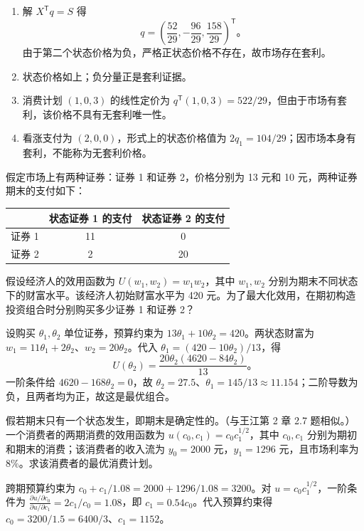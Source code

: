 \begin{solution}
\begin{enumerate}[label=(\alph*)]
\item 解 $X^{\mathsf T}q=S$ 得
\[
q=\left(\frac{52}{29},-\frac{96}{29},\frac{158}{29}\right)^{\mathsf T}。
\]
由于第二个状态价格为负，严格正状态价格不存在，故市场存在套利。
\item 状态价格如上；负分量正是套利证据。
\item 消费计划 $(1,0,3)$ 的线性定价为 $q^{\mathsf T}(1,0,3)=522/29$，但由于市场有套利，该价格不具有无套利唯一性。
\item 看涨支付为 $(2,0,0)$，形式上的状态价格值为 $2q_1=104/29$；因市场本身有套利，不能称为无套利价格。
\end{enumerate}
\end{solution}
\begin{problem}
 假定市场上有两种证券：证券 1 和证券 2，价格分别为 \num{13} 元和 \num{10} 元，两种证券期末的支付如下：
\begin{center}
\begin{tabular}{ccc}
    & 状态证券 1 的支付 & 状态证券 2 的支付\\
    \hline
    证券 1 & 11 & 0\\
    证券 2 & 2 & 20
\end{tabular}
\end{center}
假设经济人的效用函数为 $U(w_1,w_2)=w_1 w_2$，其中 $w_1,w_2$ 分别为期末不同状态下的财富水平。该经济人初始财富水平为 \num{420} 元。为了最大化效用，在期初构造投资组合时分别购买多少证券 1 和证券 2？
\end{problem}
\begin{solution}
设购买 $\theta_1,\theta_2$ 单位证券，预算约束为 $13\theta_1+10\theta_2=420$。两状态财富为 $w_1=11\theta_1+2\theta_2$、$w_2=20\theta_2$。代入 $\theta_1=(420-10\theta_2)/13$，得
\[
U(\theta_2)=\frac{20\theta_2(4620-84\theta_2)}{13}。
\]
一阶条件给 $4620-168\theta_2=0$，故 $\theta_2=27.5$、$\theta_1=145/13\approx11.154$；二阶导数为负，且两者均为正，故这是最优组合。
\end{solution}
\begin{problem}
 假若期末只有一个状态发生，即期末是确定性的。（与王江第 2 章 2.7 题相似。）一个消费者的两期消费的效用函数为 $u(c_0,c_1)=c_0 c_1^{1/2}$，其中 $c_0,c_1$ 分别为期初和期末的消费；该消费者的收入流为 $y_0=\num{2000}$ 元，$y_1=\num{1296}$ 元，且市场利率为 $8\%$。求该消费者的最优消费计划。
\end{problem}
\begin{solution}
跨期预算约束为 $c_0+c_1/1.08=2000+1296/1.08=3200$。对 $u=c_0c_1^{1/2}$，一阶条件为 $\frac{\partial u/\partial c_0}{\partial u/\partial c_1}=2c_1/c_0=1.08$，即 $c_1=0.54c_0$。代入预算约束得 $c_0=3200/1.5=6400/3$、$c_1=1152$。
\end{solution}
